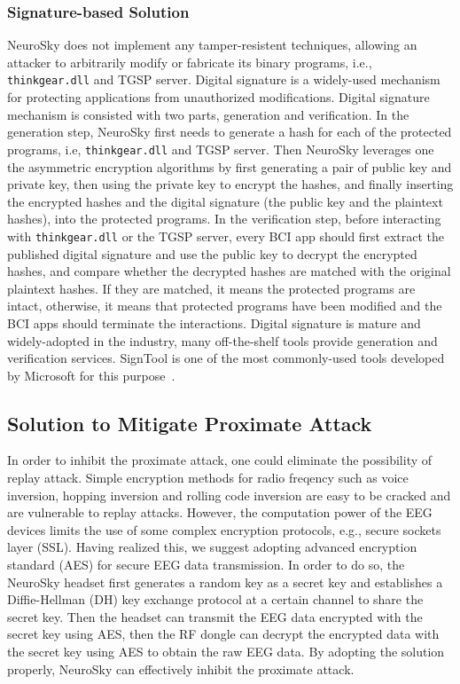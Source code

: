 \subsubsection{Signature-based Solution}
NeuroSky does not implement any tamper-resistent techniques, allowing an attacker to arbitrarily modify or fabricate its binary programs, i.e., \texttt{thinkgear.dll} and TGSP server. Digital signature is a widely-used mechanism for protecting applications from unauthorized modifications. Digital signature mechanism is consisted with two parts, generation and verification. In the generation step, NeuroSky first needs to generate a hash for each of the protected programs, i.e, \texttt{thinkgear.dll} and TGSP server. Then NeuroSky leverages one the asymmetric encryption algorithms by first generating a pair of public key and private key, then using the private key to encrypt the hashes, and finally inserting the encrypted hashes and the digital signature (the public key and the plaintext hashes), into the protected programs. In the verification step, before interacting with \texttt{thinkgear.dll} or the TGSP server, every BCI app should first extract the published digital signature and use the public key to decrypt the encrypted hashes, and compare whether the decrypted hashes are matched with the original plaintext hashes. If they are matched, it means the protected programs are intact, otherwise, it means that protected programs have been modified and the BCI apps should terminate the interactions. Digital signature is mature and widely-adopted in the industry, many off-the-shelf tools provide generation and verification services. SignTool is one of the most commonly-used tools developed by Microsoft for this purpose~\cite{signtool}.

\subsection{Solution to Mitigate Proximate Attack}
In order to inhibit the proximate attack, one could eliminate the possibility of replay attack. Simple encryption methods for radio freqency such as voice inversion, hopping inversion and rolling code inversion are easy to be cracked and are vulnerable to replay attacks. However, the computation power of the EEG devices limits the use of some complex encryption protocols, e.g., secure sockets layer (SSL). Having realized this, we suggest adopting advanced encryption standard (AES) for secure EEG data transmission. In order to do so, the NeuroSky headset first generates a random key as a secret key and establishes a Diffie-Hellman (DH) key exchange protocol at a certain channel to share the secret key. Then the headset can transmit the EEG data encrypted with the secret key using AES, then the RF dongle can decrypt the encrypted data with the secret key using AES to obtain the raw EEG data. By adopting the solution properly, NeuroSky can effectively inhibit the proximate attack.
